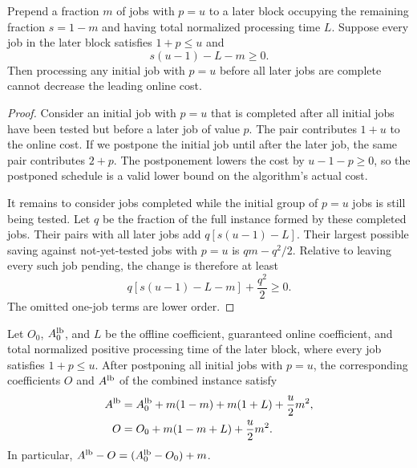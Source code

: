 \begin{lemma}[Deferring jobs with $p=u$]
\label{lem:opt:cap-deferral}
Prepend a fraction $m$ of jobs with $p=u$ to a later block occupying the
remaining fraction $s=1-m$ and having total normalized processing time $L$.
Suppose every job in the later block satisfies $1+p\le u$ and
\begin{equation}
 s(u-1)-L-m\ge0.
 \label{eq:opt:cap-deferral-condition}
\end{equation}
Then processing any initial job with $p=u$ before all later jobs are complete
cannot decrease the leading online cost.
\end{lemma}

\begin{proof}
Consider an initial job with $p=u$ that is completed after all initial jobs
have been tested but before a later job of value $p$.  The pair contributes
$1+u$ to the online cost.  If we postpone the initial job until after the
later job, the same pair contributes $2+p$.  The postponement lowers the cost
by $u-1-p\ge0$, so the postponed schedule is a valid lower bound on the
algorithm's actual cost.

It remains to consider jobs completed while the initial group of $p=u$ jobs
is still being tested.  Let $q$ be the fraction of the full instance formed
by these completed jobs.  Their
pairs with all later jobs add
$q[s(u-1)-L]$.  Their largest possible saving against not-yet-tested jobs
with $p=u$ is $qm-q^2/2$.  Relative to leaving every such job pending, the
change is therefore
at least
\begin{equation}
 q[s(u-1)-L-m]+\frac{q^2}{2}\ge0.
\end{equation}
The omitted one-job terms are lower order.
\end{proof}

\begin{lemma}[Accounting for the initial $p=u$ jobs]
\label{lem:opt:combined-accounting}
Let $O_0$, $A_0^{\rm lb}$, and $L$ be the offline coefficient, guaranteed
online coefficient, and total normalized positive processing time of the
later block, where every job satisfies $1+p\le u$.  After postponing all
initial jobs with $p=u$, the corresponding
coefficients $O$ and $A^{\rm lb}$ of the combined instance satisfy
\begin{align}
 A^{\rm lb}={}&A_0^{\rm lb}+m(1-m)+m(1+L)+\frac u2m^2,
 \label{eq:opt:combined-A}\\
 O={}&O_0+m(1-m+L)+\frac u2m^2.
 \label{eq:opt:combined-O}
\end{align}
In particular, $A^{\rm lb}-O=(A_0^{\rm lb}-O_0)+m$.
\end{lemma}

